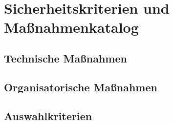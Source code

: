 \section{Sicherheitskriterien und Maßnahmenkatalog}
\subsection{Technische Maßnahmen}
\subsection{Organisatorische Maßnahmen}
\subsection{Auswahlkriterien}